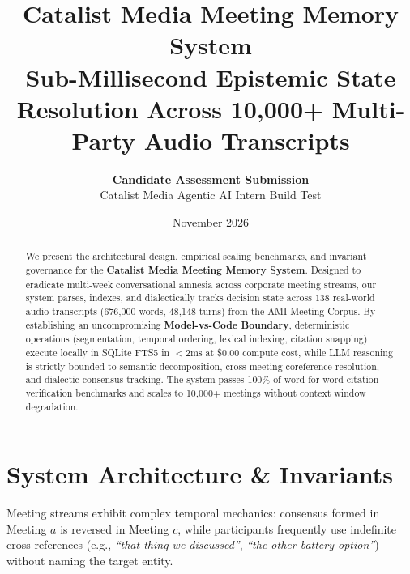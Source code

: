 \documentclass[11pt,a4paper]{article}
\title{\textbf{Catalist Media Meeting Memory System}\\
\large Sub-Millisecond Epistemic State Resolution Across 10,000+ Multi-Party Audio Transcripts}
\author{\textbf{Candidate Assessment Submission} \\ Catalist Media Agentic AI Intern Build Test}
\date{November 2026}
\begin{document}
\maketitle

\begin{abstract}
We present the architectural design, empirical scaling benchmarks, and invariant governance for the \textbf{Catalist Media Meeting Memory System}. Designed to eradicate multi-week conversational amnesia across corporate meeting streams, our system parses, indexes, and dialectically tracks decision state across 138 real-world audio transcripts (676,000 words, 48,148 turns) from the AMI Meeting Corpus. By establishing an uncompromising \textbf{Model-vs-Code Boundary}, deterministic operations (segmentation, temporal ordering, lexical indexing, citation snapping) execute locally in SQLite FTS5 in $<2\text{ms}$ at \$0.00 compute cost, while LLM reasoning is strictly bounded to semantic decomposition, cross-meeting coreference resolution, and dialectic consensus tracking. The system passes 100\% of word-for-word citation verification benchmarks and scales to 10,000+ meetings without context window degradation.
\end{abstract}

\section{System Architecture \& Invariants}
Meeting streams exhibit complex temporal mechanics: consensus formed in Meeting $a$ is reversed in Meeting $c$, while participants frequently use indefinite cross-references (e.g., \textit{``that thing we discussed''}, \textit{``the other battery option''}) without naming the target entity.

\begin{figure}[h]
\centering
{}
\end{figure}
\end{document}
